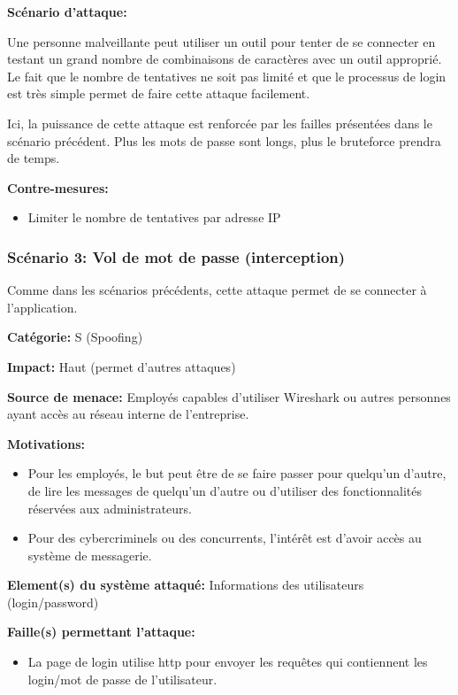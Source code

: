 \documentclass{article}
\begin{document}
\textbf{Scénario d'attaque:}

Une personne malveillante peut utiliser un outil pour tenter de se
connecter en testant un grand nombre de combinaisons de caractères avec
un outil approprié. Le fait que le nombre de tentatives ne soit pas
limité et que le processus de login est très simple permet de faire
cette attaque facilement.

Ici, la puissance de cette attaque est renforcée par les failles
présentées dans le scénario précédent. Plus les mots de passe sont
longs, plus le bruteforce prendra de temps.

\textbf{Contre-mesures:}

\begin{itemize}

\item
  Limiter le nombre de tentatives par adresse IP
\end{itemize}

\subsubsection{Scénario 3: Vol de mot de passe (interception)}

Comme dans les scénarios précédents, cette attaque permet de se
connecter à l'application.

\textbf{Catégorie:} S (Spoofing)

\textbf{Impact:} Haut (permet d'autres attaques)

\textbf{Source de menace:} Employés capables d'utiliser Wireshark ou
autres personnes ayant accès au réseau interne de l'entreprise.

\textbf{Motivations:}

\begin{itemize}

\item
  Pour les employés, le but peut être de se faire passer pour quelqu'un
  d'autre, de lire les messages de quelqu'un d'autre ou d'utiliser des
  fonctionnalités réservées aux administrateurs.
\item
  Pour des cybercriminels ou des concurrents, l'intérêt est d'avoir
  accès au système de messagerie.
\end{itemize}

\textbf{Element(s) du système attaqué:} Informations des utilisateurs
(login/password)

\textbf{Faille(s) permettant l'attaque:}

\begin{itemize}

\item
  La page de login utilise http pour envoyer les requêtes qui
  contiennent les login/mot de passe de l'utilisateur.
\end{itemize}
\end{document}
